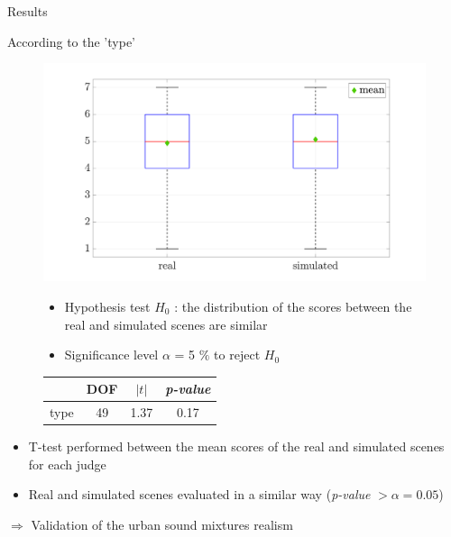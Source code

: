 \documentclass{beamer}
\begin{document}
\begin{frame}{Results}

\begin{block}{According to the 'type'}

\begin{figure}

\begin{flushleft}
\begin{minipage}[l]{.5\linewidth}
\includegraphics[width=\textwidth]{pictures/testPerceptif_boxplotType_EN.pdf}
\end{minipage}
\hspace{0.1cm}
\begin{minipage}[r]{.4\linewidth}
\begin{itemize}
\footnotesize
	\item Hypothesis test $H_0$ : the distribution of the scores between the real and simulated scenes are similar
	\item Significance level $\alpha$ = 5 $\%$ to reject $H_0$
\end{itemize}

\footnotesize
\begin{tabular}{lccc}
	& DOF & $\vert t \vert$    & \textit{p-value} \\
\hline
type & 49 & 1.37 & 0.17    \\
\hline
\end{tabular}
\label{blablatab}
\end{minipage}

\end{flushleft}

\end{figure}
\end{block}

\begin{itemize}
\footnotesize
	\item T-test performed between the mean scores of the real and simulated scenes for each judge
	\item Real and simulated scenes evaluated in a similar way (\textit{p-value} $> \alpha = 0.05$)\\
\end{itemize}

$\Rightarrow$ Validation of the urban sound mixtures realism


\end{frame}
\end{document}
